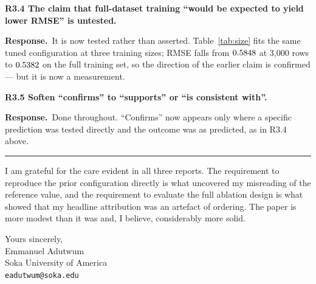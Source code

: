 \documentclass[11pt,a4paper]{article}
\newcommand{\reply}{\par\noindent\textbf{Response.}\ }
\newcommand{\pt}[1]{\par\medskip\noindent\textbf{#1}\par}
\begin{document}
\pt{R3.4 The claim that full-dataset training ``would be expected to yield lower RMSE'' is
untested.}
\reply It is now tested rather than asserted. Table~\ref{tab:size} fits the same tuned configuration at
three training sizes; RMSE falls from $0.5848$ at 3{,}000 rows to $0.5382$ on
the full training set, so the direction of the earlier claim is confirmed --- but it is now
a measurement.

\pt{R3.5 Soften ``confirms'' to ``supports'' or ``is consistent with''.}
\reply Done throughout. ``Confirms'' now appears only where a specific prediction was tested
directly and the outcome was as predicted, as in R3.4 above.

\vspace{10pt}
\hrule
\vspace{8pt}

\noindent I am grateful for the care evident in all three reports. The requirement to
reproduce the prior configuration directly is what uncovered my misreading of the reference
value, and the requirement to evaluate the full ablation design is what showed that my
headline attribution was an artefact of ordering. The paper is more modest than it was and, I
believe, considerably more solid.

\vspace{10pt}
\noindent Yours sincerely,\\[10pt]
Emmanuel Adutwum\\
Soka University of America\\
\texttt{eadutwum@soka.edu}
\end{document}
